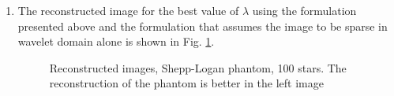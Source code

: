 \begin{enumerate}
\item The reconstructed image for the best value of $\lambda$ using the formulation presented above and the formulation that assumes the image to be sparse in wavelet domain alone is shown in Fig. \ref{fig:expt46}.
\begin{figure}[b!]
\hspace{0.4in}
\hspace{0.2in}
\caption [Reconstructed images, Shepp-Logan phantom, 100 stars]{Reconstructed images, Shepp-Logan phantom, 100 stars. The reconstruction of the phantom is better in the left image}
\label{fig:expt46}
\end{figure}



\end{enumerate}
